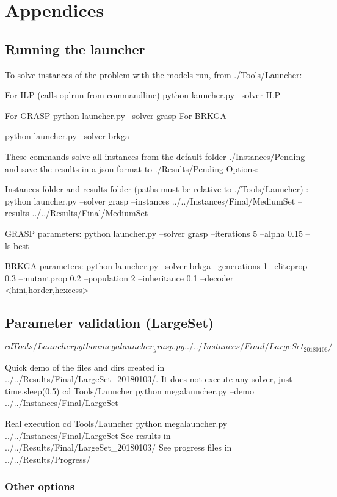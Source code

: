 \appendix
\section{Appendices}
\thispagestyle{empty}
\subsection{Running the launcher}

To solve instances of the problem with the models run, from ./Tools/Launcher:

For ILP (calls oplrun from commandline) python launcher.py --solver ILP

For GRASP python launcher.py --solver grasp For BRKGA

python launcher.py --solver brkga

These commands solve all instances from the default folder ./Instances/Pending and save the results in a json format to ./Results/Pending Options:

Instances folder and results folder (paths must be relative to ./Tools/Launcher) : python launcher.py --solver grasp --instances ../../Instances/Final/MediumSet --results ../../Results/Final/MediumSet

GRASP parameters: python launcher.py --solver grasp --iterations 5 --alpha 0.15 --ls best

BRKGA parameters: python launcher.py --solver brkga --generations 1 --eliteprop 0.3 --mutantprop 0.2 --population 2 --inheritance 0.1 --decoder <hini,horder,hexcess>

\subsection{Parameter validation (LargeSet)}

$ cd Tools/Launcher python megalauncher_grasp.py ../../Instances/Final/LargeSet_20180106/$

Quick demo of the files and dirs created in ../../Results/Final/LargeSet\_20180103/. It does not execute any solver, just time.sleep(0.5) cd Tools/Launcher python megalauncher.py --demo ../../Instances/Final/LargeSet

Real execution cd Tools/Launcher python megalauncher.py ../../Instances/Final/LargeSet See results in ../../Results/Final/LargeSet\_20180103/ See progress files in ../../Results/Progress/

\subsubsection{Other options}


